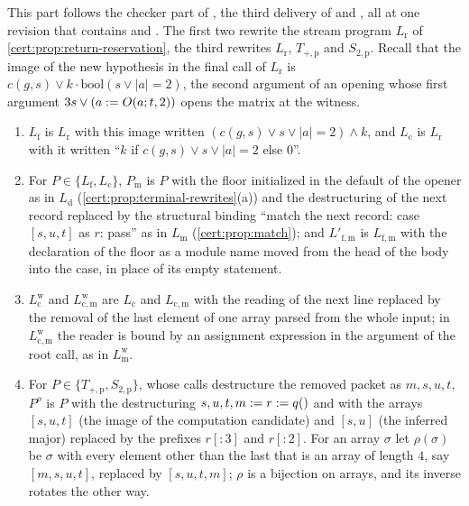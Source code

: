 This part follows the checker part of , the
third delivery of  and , all
at one revision that contains  and
. The first two rewrite the stream program $L_{\mathrm r}$
of \cref{cert:prop:return-reservation}, the third rewrites $L_{\mathrm r}$,
$T_{+,\mathrm p}$ and $S_{2,\mathrm p}$. Recall that the image of the new
hypothesis in the final call of $L_{\mathrm r}$ is
$c(g,s)\lor k\cdot\mathrm{bool}(s\lor\lvert a\rvert=2)$, the second argument of
an opening whose first argument $3s\lor(a\mathrel{:=} O(a;t,2))$ opens the matrix at
the witness.
\begin{enumerate}[label=(\roman*)]
\item $L_{\mathrm f}$ is $L_{\mathrm r}$ with this image written
$(c(g,s)\lor s\lor\lvert a\rvert=2)\land k$, and $L_{\mathrm c}$ is
$L_{\mathrm r}$ with it written ``$k$ if $c(g,s)\lor s\lor\lvert a\rvert=2$ else
$0$''.
\item For $P\in\{L_{\mathrm f},L_{\mathrm c}\}$, $P_{\mathrm m}$ is $P$ with the
floor initialized in the default of the opener as in $L_{\mathrm d}$
(\cref{cert:prop:terminal-rewrites}(a)) and the destructuring of the next record
replaced by the structural binding ``match the next record: case $[s,u,t]$ as
$r$: pass'' as in $L_{\mathrm m}$ (\cref{cert:prop:match}); and
$L'_{\mathrm{f,m}}$ is $L_{\mathrm{f,m}}$ with the declaration of the floor as a
module name moved from the head of the body into the case, in place of its empty
statement.
\item $L^{\mathrm w}_{\mathrm c}$ and $L^{\mathrm w}_{\mathrm{c,m}}$ are
$L_{\mathrm c}$ and $L_{\mathrm{c,m}}$ with the reading of the next line
replaced by the removal of the last element of one array parsed from the whole
input; in $L^{\mathrm w}_{\mathrm{c,m}}$ the reader is bound by an assignment
expression in the argument of the root call, as in $L^{\mathrm w}_{\mathrm m}$.
\item For $P\in\{T_{+,\mathrm p},S_{2,\mathrm p}\}$, whose calls destructure the
removed packet as $m,s,u,t$, $P^{\rho}$ is $P$ with the destructuring
$s,u,t,m\mathrel{:=} r\mathrel{:=} q()$ and with the arrays $[s,u,t]$ (the image of the
computation candidate) and $[s,u]$ (the inferred major) replaced by the prefixes
$r[{:}3]$ and $r[{:}2]$. For an array $\sigma$ let $\rho(\sigma)$ be $\sigma$
with every element other than the last that is an array of length $4$, say
$[m,s,u,t]$, replaced by $[s,u,t,m]$; $\rho$ is a bijection on arrays, and its
inverse rotates the other way.
\end{enumerate}

